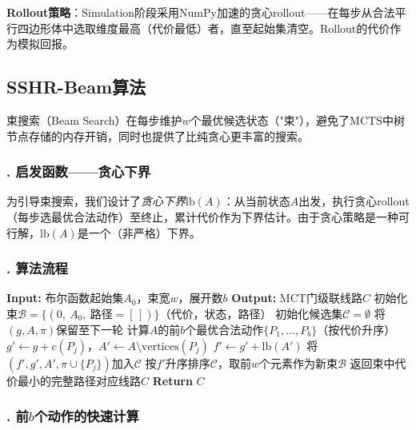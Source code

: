 \documentclass[10.5pt,compsoc,UTF8]{CjC}
\theoremstyle{mystyle}
\begin{document}
\textbf{Rollout策略}：Simulation阶段采用NumPy加速的贪心rollout——在每步从合法平行四边形体中选取维度最高（代价最低）者，直至起始集清空。Rollout的代价作为模拟回报。

\subsection{\heiti SSHR-Beam算法}

束搜索（Beam Search）在每步维护$w$个最优候选状态（"束"），避免了MCTS中树节点存储的内存开销，同时也提供了比纯贪心更丰富的搜索。

\subsubsection*{. 启发函数——贪心下界}

为引导束搜索，我们设计了\emph{贪心下界}$\text{lb}(A)$：从当前状态$A$出发，执行贪心rollout（每步选最优合法动作）至终止，累计代价作为下界估计。由于贪心策略是一种可行解，$\text{lb}(A)$是一个（非严格）下界。

\subsubsection*{. 算法流程}

\begin{algorithm}[H]
\caption{SSHR-Beam（束搜索）}
\begin{algorithmic}[1]
\State \textbf{Input:} 布尔函数起始集$A_0$，束宽$w$，展开数$b$
\State \textbf{Output:} MCT门级联线路$C$
\State 初始化束$\mathcal{B} = \{(0,\ A_0,\ \text{路径}=[\,])\}$（代价，状态，路径）
    \State 初始化候选集$\mathcal{C} = \emptyset$
        将$(g, A, \pi)$保留至下一轮\EndIf
        \State 计算$A$的前$b$个最优合法动作$\{P_1,\ldots,P_b\}$（按代价升序）
            \State $g' \gets g + c(P_j)$，$A' \gets A\setminus\text{vertices}(P_j)$
            \State $f' \gets g' + \text{lb}(A')$  
            \State 将$(f', g', A', \pi\cup\{P_j\})$加入$\mathcal{C}$
        \EndFor
    \EndFor
    \State 按$f'$升序排序$\mathcal{C}$，取前$w$个元素作为新束$\mathcal{B}$
\EndWhile
\State 返回束中代价最小的完整路径对应线路$C$
\State \textbf{Return} $C$
\end{algorithmic}
\end{algorithm}

\subsubsection*{. 前$b$个动作的快速计算}
\end{document}
